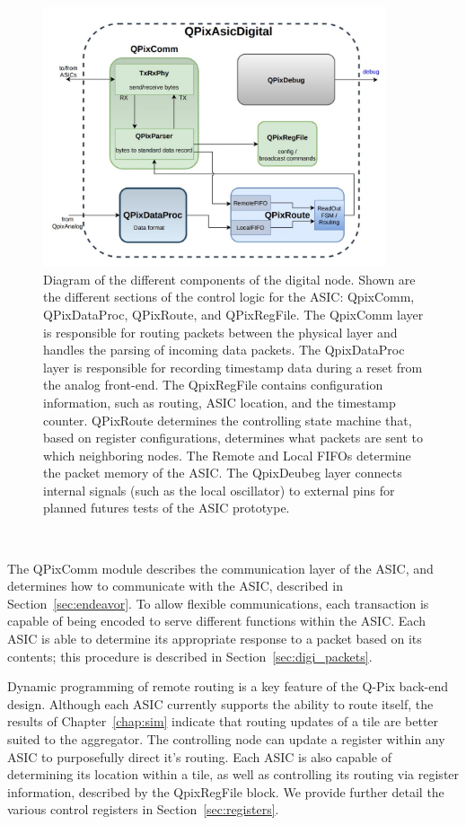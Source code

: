 \begin{figure}[]
\centering
\includegraphics[width=0.9\textwidth]{images/digital_node_overview.jpg}
\caption{Diagram of the different components of the digital node.
  Shown are the different sections of the control logic for the ASIC: QpixComm, QPixDataProc, QPixRoute, and QPixRegFile.
  The QpixComm layer is responsible for routing packets between the physical layer and handles the parsing of incoming data packets.
  The QpixDataProc layer is responsible for recording timestamp data during a reset from the analog front-end.
  The QpixRegFile contains configuration information, such as routing, ASIC location, and the timestamp counter.
  QPixRoute determines the controlling state machine that, based on register configurations, determines what packets are sent to which neighboring nodes.
  The Remote and Local FIFOs determine the packet memory of the ASIC. 
  The QpixDeubeg layer connects internal signals (such as the local oscillator) to external pins for planned futures tests of the ASIC prototype.
  }
\end{figure}~\label{fig:qpa_diagram}

The QPixComm module describes the communication layer of the ASIC, and determines how to communicate with the ASIC, described in Section~\ref{sec:endeavor}.
To allow flexible communications, each transaction is capable of being encoded to serve different functions within the ASIC.
Each ASIC is able to determine its appropriate response to a packet based on its contents; this procedure is described in Section~\ref{sec:digi_packets}.

Dynamic programming of remote routing is a key feature of the Q-Pix back-end design.
Although each ASIC currently supports the ability to route itself, the results of Chapter~\ref{chap:sim} indicate that routing updates of a tile are better suited to the aggregator.
The controlling node can update a register within any ASIC to purposefully direct it's routing.
Each ASIC is also capable of determining its location within a tile, as well as controlling its routing via register information, described by the QpixRegFile block.
We provide further detail the various control registers in Section~\ref{sec:registers}.

